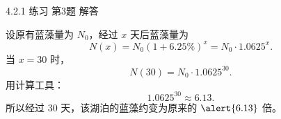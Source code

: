 \documentclass[aspectratio=169,11pt,t,fleqn]{ctexbeamer}
\begin{document}
\begin{frame}[t]{4.2.1 练习 第3题 解答}\vspace{-1em}\vspace{-0.5em}
	\linespread{1.0}\selectfont
	\begin{tcolorbox}[colback=xyyg!10,colframe=xyyg!90,title=\textbf{解}]
		设原有蓝藻量为 $N_{0}$，经过 $x$ 天后蓝藻量为
		\[
		N(x)=N_{0}(1+6.25\%)^{x}=N_{0}\cdot 1.0625^{x}.
		\]
		当 $x=30$ 时，
		\[
		N(30)=N_{0}\cdot 1.0625^{30}.
		\]
		用计算工具：
		\[
		1.0625^{30}\approx 6.13.
		\]
		所以经过 $30$ 天，该湖泊的蓝藻约变为原来的 $\alert{6.13}$ 倍。
	\end{tcolorbox}
\end{frame}
\end{document}
